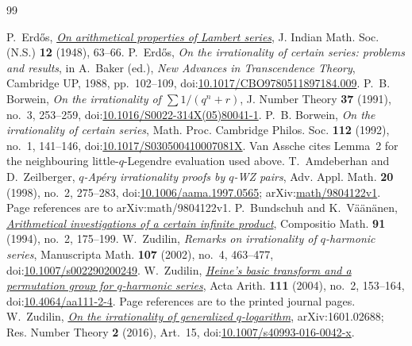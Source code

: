 \documentclass[11pt]{article}
\begin{document}
\begin{thebibliography}{99}
\small
\raggedright
\setlength{\itemsep}{2pt}
 P.~Erd\H{o}s,
  \href{https://users.renyi.hu/~p_erdos/1948-04.pdf}{\emph{On arithmetical
  properties of Lambert series}},
  J. Indian Math. Soc. (N.S.) \textbf{12} (1948), 63--66.
 P.~Erd\H{o}s, \emph{On the irrationality of certain series:
  problems and results}, in A.~Baker (ed.), \emph{New Advances in Transcendence
  Theory}, Cambridge UP, 1988, pp.~102--109,
  doi:\href{https://doi.org/10.1017/CBO9780511897184.009}{10.1017/CBO9780511897184.009}.
 P.~B. Borwein, \emph{On the irrationality of
  $\sum1/(q^{n}+r)$},
  J. Number Theory \textbf{37} (1991), no.~3, 253--259,
  doi:\href{https://doi.org/10.1016/S0022-314X(05)80041-1}{10.1016/S0022-314X(05)80041-1}.
 P.~B. Borwein, \emph{On the irrationality of certain
  series}, Math. Proc. Cambridge Philos. Soc. \textbf{112} (1992), no.~1,
  141--146,
  doi:\href{https://doi.org/10.1017/S030500410007081X}{10.1017/S030500410007081X}.
  Van Assche cites Lemma~2 for the neighbouring little-$q$-Legendre
  evaluation used above.
 T.~Amdeberhan and D.~Zeilberger, \emph{$q$-Ap\'ery
  irrationality proofs by $q$-WZ pairs}, Adv. Appl. Math. \textbf{20} (1998),
  no.~2, 275--283,
  doi:\href{https://doi.org/10.1006/aama.1997.0565}{10.1006/aama.1997.0565};
  arXiv:\href{https://arxiv.org/abs/math/9804122v1}{math/9804122v1}.
  Page references are to arXiv:math/9804122v1.
 P.~Bundschuh and K.~V\"a\"an\"anen,
  \href{https://numdam.org/item/CM_1994__91_2_175_0.pdf}{\emph{Arithmetical
  investigations of a certain infinite product}},
  Compositio Math. \textbf{91} (1994), no.~2, 175--199.
 W.~Zudilin, \emph{Remarks on irrationality of
  \(q\)-harmonic series}, Manuscripta Math. \textbf{107} (2002), no.~4,
  463--477,
  doi:\href{https://doi.org/10.1007/s002290200249}{10.1007/s002290200249}.
 W.~Zudilin,
  \href{https://geodesic.mathdoc.fr/articles/10.4064/aa111-2-4/}{\emph{Heine's
  basic transform and a permutation group for \(q\)-harmonic series}},
  Acta Arith. \textbf{111} (2004), no.~2, 153--164,
  doi:\href{https://doi.org/10.4064/aa111-2-4}{10.4064/aa111-2-4}.
  Page references are to the printed journal pages.
 W.~Zudilin,
  \href{https://arxiv.org/abs/1601.02688v2}{\emph{On the irrationality of
  generalized \(q\)-logarithm}}, arXiv:1601.02688; Res. Number Theory
  \textbf{2} (2016), Art.~15,
  doi:\href{https://doi.org/10.1007/s40993-016-0042-x}{10.1007/s40993-016-0042-x}.

\end{thebibliography}
\end{document}
